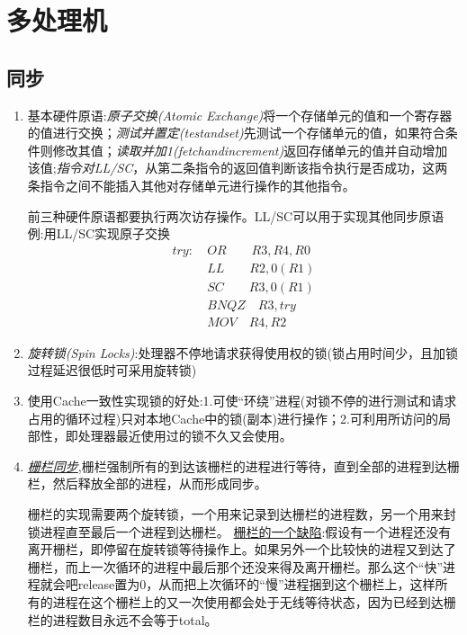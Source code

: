\documentclass[a4paper]{ctexart}
\newcommand{\li}{\uline{\hspace{0.5em}}}
\begin{document}
\section{多处理机}
\subsection{同步}
\begin{enumerate}
  \item 基本硬件原语:\emph{原子交换(Atomic Exchange)}将一个存储单元的值和一个寄存器的值进行交换；\emph{测试并置定(test\li and\li set)}先测试一个存储单元的值，如果符合条件则修改其值；\emph{读取并加1(fetch\li and\li increment)}返回存储单元的值并自动增加该值;\emph{指令对LL/SC}，从第二条指令的返回值判断该指令执行是否成功，这两条指令之间不能插入其他对存储单元进行操作的其他指令。

前三种硬件原语都要执行两次访存操作。LL/SC可以用于实现其他同步原语
例:用LL/SC实现原子交换
\begin{equation}
\begin{split}
  try:\ &OR \qquad R3, R4, R0 \\
  &LL  \qquad R2, 0(R1) \\
  &SC \qquad R3, 0(R1) \\
  &BNQZ  \quad R3, try \\
  &MOV \quad R4, R2
\end{split}
\end{equation}

\item \emph{旋转锁(Spin Locks)}:处理器不停地请求获得使用权的锁(锁占用时间少，且加锁过程延迟很低时可采用旋转锁)
\item 使用Cache一致性实现锁的好处:1.可使“环绕”进程(对锁不停的进行测试和请求占用的循环过程)只对本地Cache中的锁(副本)进行操作；2.可利用所访问的局部性，即处理器最近使用过的锁不久又会使用。

\item \emph{\underline{栅栏同步}},栅栏强制所有的到达该栅栏的进程进行等待，直到全部的进程到达栅栏，然后释放全部的进程，从而形成同步。

栅栏的实现需要两个旋转锁，一个用来记录到达栅栏的进程数，另一个用来封锁进程直至最后一个进程到达栅栏。
\underline{栅栏的一个缺陷}:假设有一个进程还没有离开栅栏，即停留在旋转锁等待操作上。如果另外一个比较快的进程又到达了栅栏，而上一次循环的进程中最后那个还没来得及离开栅栏。那么这个“快”进程就会吧release置为0，从而把上次循环的“慢”进程捆到这个栅栏上，这样所有的进程在这个栅栏上的又一次使用都会处于无线等待状态，因为已经到达栅栏的进程数目永远不会等于total。

\end{enumerate}
\end{document}

